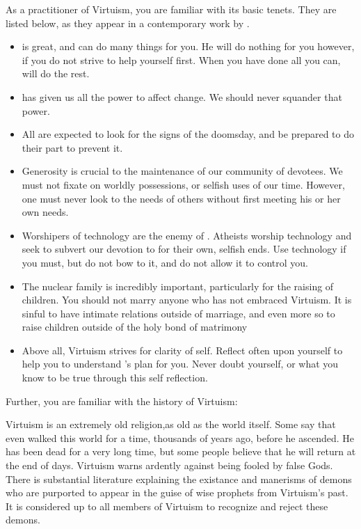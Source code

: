 \documentclass[blue]{guildcamp1}
\begin{document}
\name{\bVirtuism{}}

As a practitioner of Virtuism, you are familiar with its basic tenets. They are listed below, as they appear in a contemporary work by \cPastor{\MYname{}}.

\begin{itemize}
  \item \cGod{\MYname{}} is great, and can do many things for you. He will do nothing for you however, if you do not strive to help yourself first. When you have done all you can, \cGod{\MYname{}} will do the rest.
  
  \item \cGod{\MYname{}} has given us all the power to affect change. We should never squander that power. 
  
  \item All are expected to look for the signs of the doomsday, and be prepared to do their part to prevent it. 
  
  \item Generosity is crucial to the maintenance of our community of devotees. We must not fixate on worldly possessions, or selfish uses of our time. However, one must never look to the needs of others without first meeting his or her own needs.
  
  \item Worshipers of technology are the enemy of \cGod{}. Atheists worship technology and seek to subvert our devotion to \cGod{} for their own, selfish ends. Use technology if you must, but do not bow to it, and do not allow it to control you.
  
  \item The nuclear family is incredibly important, particularly for the raising of children. You should not marry anyone who has not embraced Virtuism. It is sinful to have intimate relations outside of marriage, and even more so to raise children outside of the holy bond of matrimony
  
  \item Above all, Virtuism strives for clarity of self. Reflect often upon yourself to help you to understand \cGod{}'s plan for you. Never doubt yourself, or what you know to be true through this self reflection.
\end{itemize}

Further, you are familiar with the history of Virtuism:

Virtuism is an extremely old religion,as old as the world itself. Some say that \cGod{} even walked this world for a time, thousands of years ago, before he ascended. He has been dead for a very long time, but some people believe that he will return at the end of days. Virtuism warns ardently against being fooled by false Gods. There is substantial literature explaining the existance and manerisms of demons who are purported to appear in the guise of wise prophets from Virtuism's past. It is considered up to all members of Virtuism to recognize and reject these demons.
\end{document}
